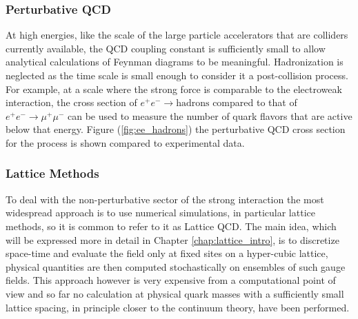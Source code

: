 \subsubsection{Perturbative QCD}
At high energies, like the scale of the large particle accelerators that are colliders currently available, the QCD coupling constant is sufficiently small to allow analytical calculations of Feynman diagrams to be meaningful. Hadronization is neglected as the time scale is small enough to consider it a post-collision process. 
For example, at a scale where the strong force is comparable to the electroweak interaction, the cross section of $e^+e^-\rightarrow \text{hadrons}$ compared to that of $e^+e^-\rightarrow \mu^+\mu^-$ can be used to measure the number of quark flavors that are active below that energy. Figure (\ref{fig:ee_hadrons}) the perturbative QCD cross section for the process is shown compared to experimental data.

\subsubsection{Lattice Methods}
To deal with the non-perturbative sector of the strong interaction the most widespread approach is to use numerical simulations, in particular lattice methods, so it is common to refer to it as Lattice QCD. The main idea, which will be expressed more in detail in Chapter \ref{chap:lattice_intro}, is to discretize space-time and evaluate the field only at fixed sites on a hyper-cubic lattice, physical quantities are then computed stochastically on ensembles of such gauge fields. This approach however is very expensive from a computational point of view and so far no calculation at physical quark masses with a sufficiently small lattice spacing, in principle closer to the continuum theory, have been performed.

